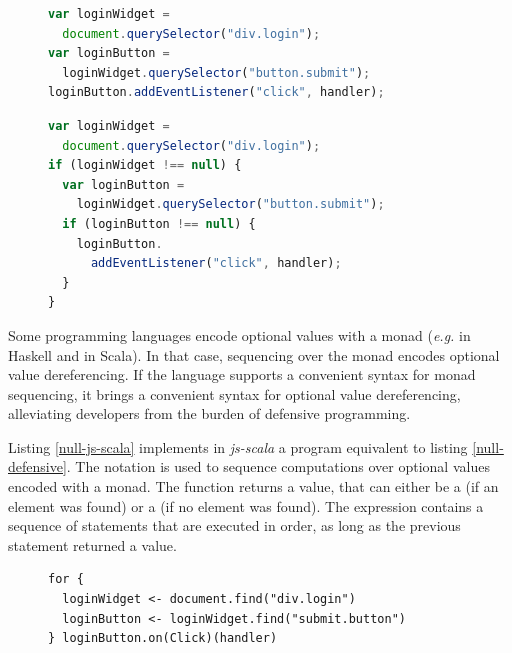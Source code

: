 \documentclass[preprint]{sigplanconf}
\newcommand{\eg}{\emph{e.g.}}
\begin{document}
\begin{figure}
\begin{lstlisting}[language=JavaScript,label=null-unsafe,caption=Unsafe code]
var loginWidget =
  document.querySelector("div.login");
var loginButton =
  loginWidget.querySelector("button.submit");
loginButton.addEventListener("click", handler);
\end{lstlisting}
\end{figure}


\begin{figure}
\begin{lstlisting}[language=JavaScript,label=null-defensive,caption=Defensive programming to handle null references]
var loginWidget =
  document.querySelector("div.login");
if (loginWidget !== null) {
  var loginButton =
    loginWidget.querySelector("button.submit");
  if (loginButton !== null) {
    loginButton.
      addEventListener("click", handler);
  }
}
\end{lstlisting}
\end{figure}

Some programming languages encode optional values with a monad (\eg {} in Haskell and  in
Scala). In that case, sequencing over the monad encodes optional value dereferencing. If the language supports a
convenient syntax for monad sequencing, it brings a convenient syntax for optional value dereferencing, alleviating
developers from the burden of defensive programming.

Listing \ref{null-js-scala} implements in \emph{js-scala} a program equivalent to listing \ref{null-defensive}. The
 notation is used to sequence computations over optional values encoded with a monad. The 
function returns a  value, that can either be a  (if an element
was found) or a  (if no element was found). The  expression contains a sequence
of statements that are executed in order, as long as the previous statement returned a 
value.

\begin{figure}
\begin{lstlisting}[label=null-js-scala,caption=Handling null references in js-scala]
for {
  loginWidget <- document.find("div.login")
  loginButton <- loginWidget.find("submit.button")
} loginButton.on(Click)(handler)
\end{lstlisting}
\end{figure}
\end{document}
